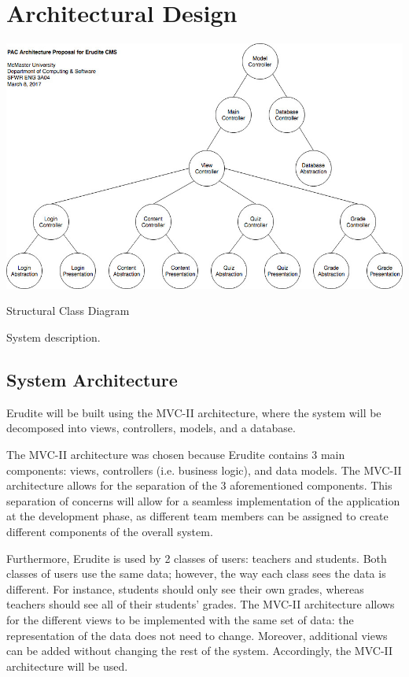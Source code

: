 \documentclass[]{article}
\begin{document}
\section{Architectural Design}
\label{sec:architectural_design}

{
  \centering
    \includegraphics[scale=0.5]{A2_Assets/Structural_Class_Diagram_v2.jpg}
  \centerline{Structural Class Diagram}
}
System description.

\subsection{System Architecture}
\label{sub:system_architecture}
Erudite will be built using the MVC-II architecture, where the system will be decomposed into views, controllers, models, and a database.

The MVC-II architecture was chosen because Erudite contains 3 main components: views, controllers (i.e. business logic), and data models. The MVC-II architecture allows for the separation of the 3 aforementioned components. This separation of concerns will allow for a seamless implementation of the application at the development phase, as different team members can be assigned to create different components of the overall system.

Furthermore, Erudite is used by 2 classes of users: teachers and students. Both classes of users use the same data; however, the way each class sees the data is different. For instance, students should only see their own grades, whereas teachers should see all of their students' grades. The MVC-II architecture allows for the different views to be implemented with the same set of data: the representation of the data does not need to change.  Moreover, additional views can be added without changing the rest of the system. Accordingly, the MVC-II architecture will be used.
\end{document}
